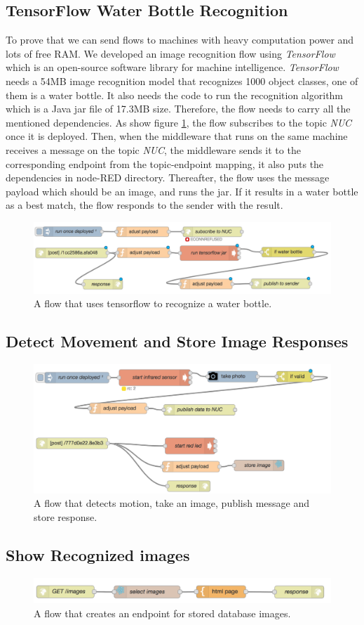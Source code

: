 \subsection{TensorFlow Water Bottle Recognition}
To prove that we can send flows to machines with heavy computation power and lots of free RAM. We developed an image recognition flow using \textit{TensorFlow} which is an open-source software library for machine intelligence. \textit{TensorFlow} needs a 54MB image recognition model that recognizes 1000 object classes, one of them is a water bottle. It also needs the code to run the recognition algorithm which is a Java jar file of 17.3MB size. Therefore, the flow  needs to carry all the mentioned dependencies. As show figure \ref{fig:flow-tensor}, the flow subscribes to the topic \textit{NUC} once it is deployed. Then, when the middleware that runs on the same machine receives a message on the topic \textit{NUC}, the middleware sends it to the corresponding endpoint  from the topic-endpoint mapping, it also puts the dependencies in node-RED directory. Thereafter, the flow uses the message payload which should be an image, and runs the jar. If it results in a water bottle as a best match, the flow responds to the sender with the result.
 \begin{figure}[H]
	\centering
	\includegraphics[scale=0.6]{images/flow-tensor.png}
	\caption{A flow that uses tensorflow to recognize a water bottle.}
	\label{fig:flow-tensor}
\end{figure}
\subsection{Detect Movement and Store Image Responses}
 \begin{figure}[H]
	\centering
	\includegraphics[scale=0.6]{images/flow-motion.png}
	\caption{A flow that detects motion, take an image, publish message and store response.}
	\label{fig:flow-motion}
\end{figure}
\subsection{Show Recognized images}
 \begin{figure}[H]
	\centering
	\includegraphics[scale=0.6]{images/flow-images.png}
	\caption{A flow that creates an endpoint for stored database images.}
	\label{fig:flow-image}
\end{figure}